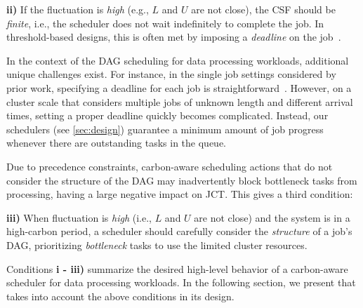 \textbf{ii) } If the fluctuation is \textit{high} (e.g., $L$ and $U$ are not close), the CSF should be \textit{finite}, i.e., the scheduler does not wait indefinitely to complete the job.  In threshold-based designs, this is often met by imposing a \textit{deadline} on the job~\cite{Goiri:2012:GreenHadoop, Lechowicz:23}.

In the context of the DAG scheduling for data processing workloads, additional unique challenges exist. For instance, in the single job settings considered by prior work, specifying a deadline for each job is straightforward~\cite{Lechowicz:23, Bostandoost:24}.  However, on a cluster scale that considers multiple jobs of unknown length and different arrival times, setting a proper deadline quickly becomes complicated. Instead, our schedulers (see \autoref{sec:design}) guarantee a minimum amount of job progress whenever there are outstanding tasks in the queue.  

Due to precedence constraints, carbon-aware scheduling actions that do not consider the structure of the DAG may inadvertently block bottleneck tasks from processing, having a large negative impact on JCT.  This gives a third condition:

\textbf{iii) } When fluctuation is \textit{high} (i.e., $L$ and $U$ are not close) and the system is in a high-carbon period,
a scheduler should carefully consider the \textit{structure} of a job's DAG, prioritizing \textit{bottleneck} tasks to use the limited cluster resources.

\noindent Conditions \textbf{i - iii)} summarize the desired high-level behavior of a carbon-aware scheduler for data processing workloads.  In the following section, we present \PCAPS that takes into account the above conditions in its design.




















